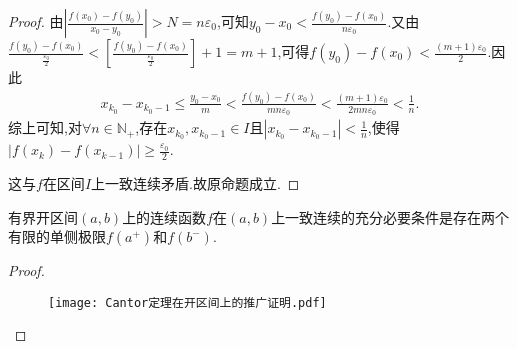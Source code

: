 \documentclass[lang=cn,newtx,10pt,scheme=chinese]{../Template/elegantbook}
\begin{document}
\begin{proof}
        由\(\left| \frac{f\left( x_0 \right) -f\left( y_0 \right)}{x_0 - y_0} \right|>N=n\varepsilon_0\),可知\(y_0 - x_0<\frac{f\left( y_0 \right) -f\left( x_0 \right)}{n\varepsilon_0}\).又由\(\frac{f\left( y_0 \right) -f\left( x_0 \right)}{\frac{\varepsilon _0}{2}}<\left[ \frac{f\left( y_0 \right) -f\left( x_0 \right)}{\frac{\varepsilon _0}{2}} \right] + 1 = m + 1\),可得\(f\left( y_0 \right) -f\left( x_0 \right) <\frac{\left( m + 1 \right) \varepsilon _0}{2}\).因此
        \begin{align*}
            x_{k_0}-x_{k_0 - 1}\leq \frac{y_0 - x_0}{m}<\frac{f\left( y_0 \right) -f\left( x_0 \right)}{mn\varepsilon_0}<\frac{\left( m + 1 \right) \varepsilon _0}{2mn\varepsilon_0}<\frac{1}{n}.
        \end{align*}
        综上可知,对\(\forall n\in \mathbb{N} _+\),存在\(x_{k_0},x_{k_0 - 1}\in I\)且\(\left| x_{k_0}-x_{k_0 - 1} \right|<\frac{1}{n}\),使得\(\left| f\left( x_k \right) -f\left( x_{k - 1} \right) \right|\geq \frac{\varepsilon _0}{2}\).
        
        这与\(f\)在区间\(I\)上一致连续矛盾.故原命题成立.
\end{proof}

\begin{proposition}[Cantor定理在开区间上的推广]\label{pro:Cantor定理在开区间上的推广}
    有界开区间\((a,b)\)上的连续函数\(f\)在\((a,b)\)上一致连续的充分必要条件是存在两个有限的单侧极限\(f(a^{+})\)和\(f(b^{-})\).
\end{proposition}
\begin{proof}
    \begin{figure}[htbp]
        \centering
        \texttt{[image: Cantor定理在开区间上的推广证明.pdf]}
    \end{figure} 
\end{proof}
\end{document}
